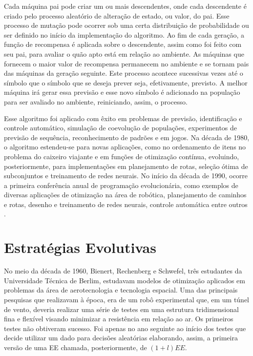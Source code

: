 Cada máquina pai pode criar um ou mais descendentes, onde cada descendente é criado pelo processo aleatório de alteração de estado, ou valor, do pai. Esse processo de mutação pode ocorrer sob uma certa distribuição de probabilidade ou ser definido no início da implementação do algoritmo. Ao fim de cada geração, a função de recompensa é aplicada sobre o descendente, assim como foi feito com seu pai, para avaliar o quão apto está em relação ao ambiente. As máquinas que fornecem o maior valor de recompensa permanecem no ambiente e se tornam pais das máquinas da geração seguinte. Este processo acontece sucessivas vezes até o símbolo que o símbolo que se deseja prever seja, efetivamente, previsto. A melhor máquina irá gerar essa previsão e esse novo símbolo é adicionado na população para ser avaliado no ambiente, reiniciando, assim, o processo.

Esse algoritmo foi aplicado com êxito em problemas de previsão, identificação e controle automático, simulação de coevolução de populações, experimentos de previsão de sequência, reconhecimento de padrões e em jogos. Na década de 1980, o algoritmo estendeu-se para novas aplicações, como no ordenamento de itens no problema do caixeiro viajante e em funções de otimização contínua, evoluindo, posteriormente, para implementações em planejamento de rotas, seleção ótima de subconjuntos e treinamento de redes neurais. No início da década de 1990, ocorre a primeira conferência anual de programação evolucionária, como exemplos de diversas aplicações de otimização na área de robótica, planejamento de caminhos e rotas, desenho e treinamento de redes neurais, controle automática entre outros .

\section{Estratégias Evolutivas} 

No meio da década de 1960, Bienert, Rechenberg e Schwefel, três estudantes da Universidade Técnica de Berlim, estudavam modelos de otimização aplicados em problemas da área de aerotecnologia e tecnologia espacial. Uma das principais pesquisas que realizavam à época, era de um robô experimental que, em um túnel de vento, deveria realizar uma série de testes em uma estrutura tridimensional fina e flexível visando minimizar a resistência em relação ao ar. Os primeiros testes não obtiveram sucesso. Foi apenas no ano seguinte ao início dos testes que \cite{rechenberg_cybernetic_1965} decide utilizar um dado para decisões aleatórias elaborando, assim, a primeira versão de uma EE \cite[pg.A2.3:6]{back_handbook_1997} chamada, posteriormente, de $(1 + l) EE$. 

